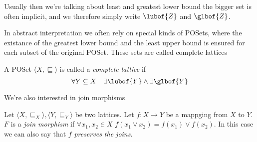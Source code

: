 Usually then we're talking about least and greatest lower bound the
bigger set is often implicit, and we therefore simply write
\(\lubof{Z}\) and \(\glbof{Z}\).

In abstract interpretation we often rely on special kinds of POSets,
where the existance of the greatest lower bound and the least upper
bound is ensured for each subset of the original POSet. These sets are
called complete lattices

\begin{definition}
  A POSet \(\langle X, \sqsubseteq\rangle\) is called a \emph{complete
  lattice} if \[\forall Y \subseteq X \quad \exists \lubof{Y} \wedge
  \exists \glbof{Y}\]
\end{definition}

We're also interested in join morphisms

\begin{definition}
  Let \(\langle X, \sqsubseteq_X \rangle, \langle Y, \sqsubseteq_Y
  \rangle\) be two lattices. Let \(f : X \to Y\) be a mappging from
  \(X\) to \(Y\). \(F\) is a \emph{join morphism} if \(\forall x_1,
  x_2 \in X\) \(f(x_1 \vee x_2) = f(x_1) \vee f(x_2)\). In this case
  we can also say that \(f\) \emph{preserves the joins}.
\end{definition}
